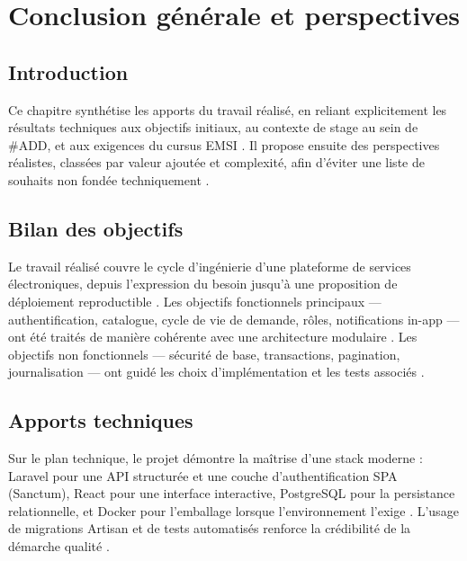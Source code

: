 \chapter{Conclusion générale et perspectives}
\label{chap:conclusion}

\section{Introduction}

Ce chapitre synthétise les apports du travail réalisé, en reliant explicitement les résultats techniques aux objectifs initiaux, au contexte de stage au sein de \#ADD, et aux exigences du cursus EMSI \cite{sommerville2016,bass2021}. Il propose ensuite des perspectives réalistes, classées par valeur ajoutée et complexité, afin d'éviter une liste de souhaits non fondée techniquement \cite{kleppmann2017,newman2021}.

\section{Bilan des objectifs}

Le travail réalisé couvre le cycle d'ingénierie d'une plateforme de services électroniques, depuis l'expression du besoin jusqu'à une proposition de déploiement reproductible \cite{pressman2014,ieee1012}. Les objectifs fonctionnels principaux — authentification, catalogue, cycle de vie de demande, rôles, notifications in-app — ont été traités de manière cohérente avec une architecture modulaire \cite{fowler2002,gamma1994}. Les objectifs non fonctionnels — sécurité de base, transactions, pagination, journalisation — ont guidé les choix d'implémentation et les tests associés \cite{owasp2021,iso25010}.

\section{Apports techniques}

Sur le plan technique, le projet démontre la maîtrise d'une stack moderne : Laravel pour une API structurée et une couche d'authentification SPA (Sanctum), React pour une interface interactive, PostgreSQL pour la persistance relationnelle, et Docker pour l'emballage lorsque l'environnement l'exige \cite{laraveldoc,sanctumdoc,reactdoc,postgresdoc,dockerdoc}. L'usage de migrations Artisan et de tests automatisés renforce la crédibilité de la démarche qualité \cite{kleppmann2017,sommerville2016}.

